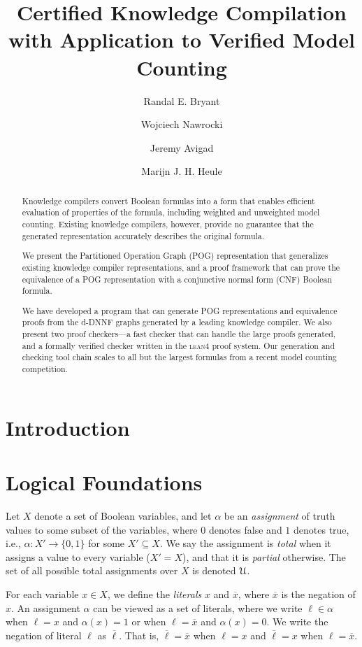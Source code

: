 \documentclass[letterpaper,USenglish,cleveref, autoref, thm-restate]{lipics-v2021}
\title{Certified Knowledge Compilation \\ with Application to Verified Model Counting}
\author{Randal E. Bryant}{Computer Science Department, Carnegie Mellon University, Pittsburgh, PA 15213 USA}{rebryant@cmu.edu}{https://orcid.org/0000-0001-5024-6613}{Supported by NSF grant CCF-2108521}
\author{Wojciech Nawrocki}{Department of Philosophy, Carnegie Mellon University}{wjnawrock@cmu.edu}{https://orcid.org/0000-0002-8839-0618}{}
\author{Jeremy Avigad}{Department of Philosophy, Carnegie Mellon University}{avigad@cmu.edu}{https://orcid.org/0000-0003-1275-315X}{}
\author{Marijn J. H. Heule}{Computer Science Department, Carnegie Mellon University}{marijn@cmu.edu}{https://orcid.org/0000-0002-5587-8801}{Supported by NSF grant CCF-2108521}
\newcommand{\obar}[1]{\overline{#1}}
\newcommand{\lit}{\ell}
\newcommand{\varset}{X}
\newcommand{\assign}{\alpha}
\newcommand{\uassign}{{\cal U}}
\newcommand{\program}[1]{\textsc{#1}}
\newcommand{\lean}{\program{lean4}}
\begin{document}
\maketitle

\begin{abstract}
  Knowledge compilers convert Boolean formulas into a form 
  that enables efficient evaluation of properties of the formula,
  including
  weighted and unweighted model counting.
 Existing knowledge compilers, however,
provide no guarantee that the generated representation accurately
describes the original formula.

We present the Partitioned Operation Graph (POG) representation that
generalizes existing knowledge compiler representations, and a proof
framework that can prove the equivalence of a POG representation with
a conjunctive normal form (CNF) Boolean formula.

We have developed a program that can generate POG representations and
equivalence proofs from the d-DNNF graphs generated by a leading
knowledge compiler.  We also present two proof
checkers---a fast checker that can handle the large proofs generated,
and a formally verified checker written in the \lean{} proof system.
Our generation and checking tool chain scales to all but the largest formulas from a
recent model counting competition.  
\end{abstract}

\section{Introduction}


\section{Logical Foundations}

  Let $\varset$ denote a set of Boolean variables, and let $\assign$
  be an {\em assignment} of truth values to some subset of the
  variables, where $0$ denotes false and $1$ denotes true, i.e.,
  $\assign \colon \varset' \rightarrow \{0,1\}$ for some $\varset'
  \subseteq \varset$.  We say the assignment is {\em total} when it
  assigns a value to every variable ($\varset' = \varset$), and that
  it is {\em partial} otherwise.
  The set of all possible total assignments over
  $\varset$ is denoted $\uassign$.

For each variable $x \in \varset$,
  we define the {\em literals} $x$ and $\obar{x}$, where $\obar{x}$ is the
  negation of $x$. An
  assignment $\assign$ can be viewed as a set of literals, where
  we write $\lit \in \assign$ when $\lit = x$ and $\assign(x) = 1$ or when
  $\lit = \obar{x}$ and $\assign(x) = 0$.  We write the negation of literal $\lit$ as $\obar{\lit}$.  That is, $\obar{\lit} = \obar{x}$ when $\lit = x$ and
$\obar{\lit} = x$ when $\lit = \obar{x}$.
\end{document}
